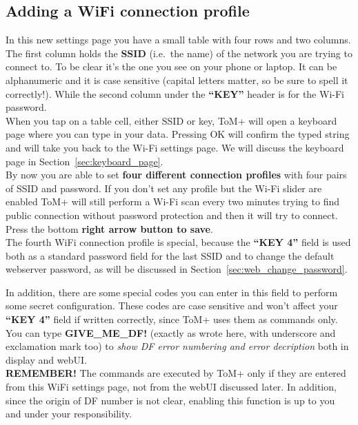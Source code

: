\subsection{Adding a WiFi connection profile}
\label{sec:add_wifi_profile}

In this new settings page you have a small table with four rows and two columns.
The first column holds the \textbf{SSID} (i.e.~the name) of the network you are trying to connect to. 
To be clear it's the one you see on your phone or laptop. It can be alphanumeric and 
it is case sensitive (capital letters matter, so be sure to spell it correctly!).
While the second column under the \textbf{“KEY”} header is for the Wi-Fi password.\\

When you tap on a table cell, either SSID or key, ToM+ will open a keyboard page
where you can type in your data. Pressing OK will confirm the typed string and will
take you back to the Wi-Fi settings page. We will discuss the keyboard page in Section~\ref{sec:keyboard_page}.\\

By now you are able to set \textbf{four different connection profiles} with four pairs of SSID
and password. If you don't set any profile but the Wi-Fi slider are enabled ToM+ will still
perform a Wi-Fi scan every two minutes trying to find public connection without password
protection and then it will try to connect. Press the bottom \textbf{right arrow button to save}.\\

The fourth WiFi connection profile is special, because the \textbf{“KEY 4”} field is
used both as a standard password field for the last SSID and to change the default webserver password,
as will be discussed in Section~\ref{sec:web_change_password}.

In addition, there are some special codes you can enter in this field to perform some
secret configuration. These codes are case sensitive and won't affect your \textbf{“KEY 4”}
field if written correctly, since ToM+ uses them as commands only. You can type
\textbf{GIVE\_ME\_DF!} (exactly as wrote here, with underscore
and exclamation mark too) to \textit{show DF error numbering and error decription} both in 
display and webUI.\\

\textbf{REMEMBER!} The commands are executed by ToM+ only if they are entered from
this WiFi settings page, not from the webUI discussed later. In addition, since the
origin of DF number is not clear, enabling this function is up to you and under 
your responsibility.

